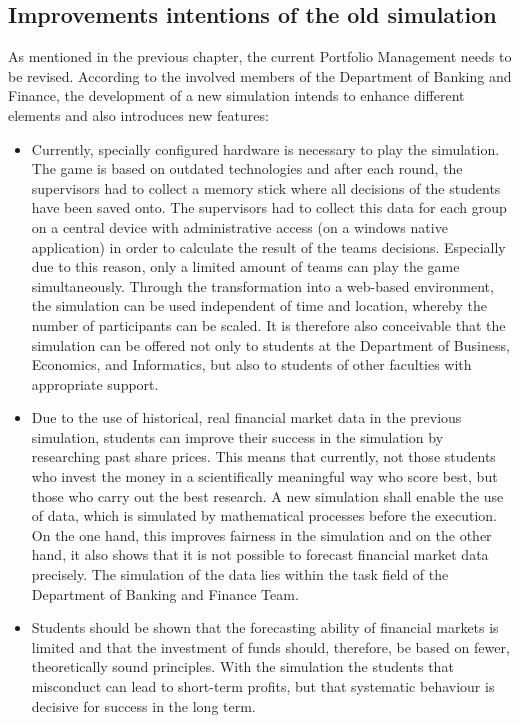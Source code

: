 \subsection{Improvements intentions of the old simulation}
As mentioned in the previous chapter, the current Portfolio Management needs to be revised. According to the involved members of the Department of Banking and Finance, the development of a new simulation intends to enhance different elements and also introduces new features:
\begin{itemize}
  \item Currently, specially configured hardware is necessary to play the simulation. The game is based on outdated technologies and after each round, the supervisors had to collect a memory stick where all decisions of the students have been saved onto. The supervisors had to collect this data for each group on a central device with administrative access (on a windows native application) in order to calculate the result of the teams decisions. Especially due to this reason, only a limited amount of teams can play the game simultaneously. Through the transformation into a web-based environment, the simulation can be used independent of time and location, whereby the number of participants can be scaled. It is therefore also conceivable that the simulation can be offered not only to students at the Department of Business, Economics, and Informatics, but also to students of other faculties with appropriate support.
  \item Due to the use of historical, real financial market data in the previous simulation, students can improve their success in the simulation by researching past share prices. This means that currently, not those students who invest the money in a scientifically meaningful way who score best, but those who carry out the best research. A new simulation shall enable the use of data, which is simulated by mathematical processes before the execution. On the one hand, this improves fairness in the simulation and on the other hand, it also shows that it is not possible to forecast financial market data precisely. The simulation of the data lies within the task field of the Department of Banking and Finance Team.
  \item Students should be shown that the forecasting ability of financial markets is limited and that the investment of funds should, therefore, be based on fewer, theoretically sound principles. With the simulation the students that misconduct can lead to short-term profits, but that systematic behaviour is decisive for success in the long term.
\end{itemize}

